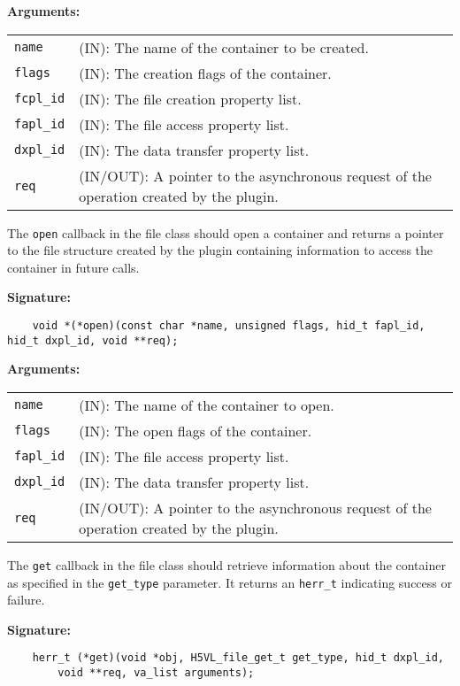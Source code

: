 \textbf{Arguments:}\\
\begin{tabular}{l p{10cm}}
  {\tt name} & (IN): The name of the container to be created.\\
  {\tt flags} & (IN): The creation flags of the container.\\
  {\tt fcpl\_id} & (IN): The file creation property list.\\
  {\tt fapl\_id} & (IN): The file access property list.\\
  {\tt dxpl\_id} & (IN): The data transfer property list.\\
  {\tt req} & (IN/OUT): A pointer to the asynchronous request of the
  operation created by the plugin.\\
\end{tabular}

The {\tt open} callback in the file class should open a container and
returns a pointer to the file structure created by the plugin containing information to
access the container in future calls.

\textbf{Signature:}
\begin{lstlisting}
    void *(*open)(const char *name, unsigned flags, hid_t fapl_id, hid_t dxpl_id, void **req);
\end{lstlisting}

\textbf{Arguments:}\\
\begin{tabular}{l p{10cm}}
  {\tt name} & (IN): The name of the container to open.\\
  {\tt flags} & (IN): The open flags of the container.\\
  {\tt fapl\_id} & (IN): The file access property list.\\
  {\tt dxpl\_id} & (IN): The data transfer property list.\\
  {\tt req} & (IN/OUT): A pointer to the asynchronous request of the
  operation created by the plugin.\\
\end{tabular}

The {\tt get} callback in the file class should retrieve
information about the container as specified in the {\tt get\_type}
parameter. It returns an {\tt herr\_t} indicating success or failure.

\textbf{Signature:}
\begin{lstlisting}
    herr_t (*get)(void *obj, H5VL_file_get_t get_type, hid_t dxpl_id, 
        void **req, va_list arguments);
\end{lstlisting}

